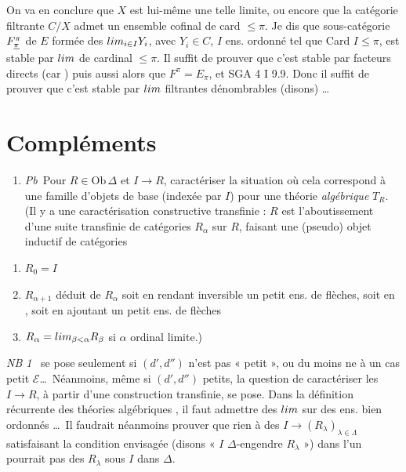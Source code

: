 \documentclass[11pt,a4paper]{article}
\begin{document}
On va en conclure que  $X$ est \struck{\ill{}} lui-même
une telle limite, ou encore que la catégorie filtrante $C/X$ admet
un ensemble cofinal de card $\leqslant \pi$.  Je dis que \struck{\ill{}} sous-catégorie
$F^{\pi}_{\uncertain{\pi}}$ de $E$ formée des $\varinjlim_{i \in I} Y_{i}$,
avec $Y_{i} \in C$, $I$ ens. ordonné tel que Card $I \leqslant \pi$,
est stable par $\varinjlim$ de cardinal $\leqslant \pi$. Il suffit de
prouver que c'est stable par facteurs directs (car \ill{} \ill{}) puis
aussi alors que $F^{\pi} = E_{\pi}$, et \ill{}  SGA 4
I 9.9. Donc il suffit de prouver que c'est stable par $\varinjlim$
filtrantes dénombrables (disons) …

\section{Compléments}

\begin{enumerate}
  \item[(1)] \emph{Pb}\ Pour $R \in \mathrm{Ob}\,\Delta$ et
    $I \to R$,  caractériser la situation où cela
    correspond à une famille d'objets de base (indexée par $I$) pour une
    théorie \emph{algébrique} $T_{R}$. (Il y a une caractérisation
    constructive transfinie : $R$ est l'aboutissement d'une suite
    transfinie de catégories $R_{\alpha}$ sur $R$, faisant une (pseudo)
    \struck{\ill{}} objet inductif de catégories 
\end{enumerate}

\begin{enumerate}
  \item[(1)] $R_{0} = I$
  \item[(2)] $R_{\alpha+1}$ déduit de $R_{\alpha}$ soit en rendant
    inversible un petit ens. de flèches, soit en \struck{\ill{}}
     , soit en
    ajoutant un petit ens. de flèches
  \item[(3)] $R_{\alpha} = \varinjlim_{\beta < \alpha} R_{\beta}$ si
    $\alpha$ ordinal limite.)
\end{enumerate}


\emph{NB 1}\ \struck{\ill{}}  se pose
seulement si $(d', d'')$ n'est pas « petit », ou du moins ne  à un cas petit $\mathcal{E}$…\ Néanmoins, même si $(d', d'')$
petits, la question de caractériser les $I \to R$, à partir d'une
construction transfinie, se pose. Dans la définition récurrente des
théories algébriques , il faut admettre des $\varinjlim$
sur des ens. bien ordonnés …\ Il faudrait néanmoins prouver que
rien à des $I \to (R_{\lambda})_{\lambda \in \Lambda}$ satisfaisant la
condition envisagée (disons « $I$ $\Delta$-engendre $R_{\lambda}$ »)
dans l'un \ill{} pourrait pas \ill{}  des
$R_{\lambda}$ sous $I$ dans $\Delta$.
\end{document}
